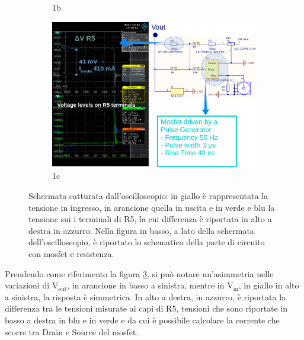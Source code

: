 \begin{figure}
\begin{subfigure}{.5\textwidth}
  \caption{1b}
  \label{TransientTest:sfig2}
\end{subfigure}
\begin{subfigure}{.95\textwidth}
  \centering
  \includegraphics[width=\linewidth]{Immagini/zoomTransientTest3}
  \caption{1c}
  \label{TransientTest:sfig3}
\end{subfigure}
\caption{Schermata catturata dall'oscilloscopio: in giallo è rappresentata la tensione in ingresso, in arancione quella in uscita e in verde e blu la tensione sui i terminali di R5, la cui differenza è riportata in alto a destra in azzurro. Nella figura in basso, a lato della schermata dell'oscilloscopio, è riportato lo schematico della parte di circuito con mosfet e resistenza.}
\label{TransientTest}
\end{figure}
Prendendo come riferimento la figura \ref{TransientTest}, si può notare un'asimmetria nelle variazioni di $\mathrm{V_{out}}$, in arancione in basso a sinistra, mentre in $\mathrm{V_{in}}$, in giallo in alto a sinistra, la risposta è simmetrica.
In alto a destra, in azzurro, è riportata la differenza tra le tensioni misurate ai capi di R5, tensioni che sono riportate in basso a destra in blu e in verde e da cui è possibile calcolare la corrente che scorre tra Drain e Source del mosfet. 
